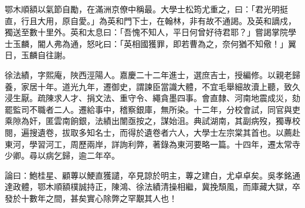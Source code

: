 \begin{pinyinscope}
鄂木順額以氣節自勵，在滿洲京僚中稱最。大學士松筠尤重之，曰：「君光明挺直，行且大用，原自愛。」為英和門下士，在翰林，非有故不通謁。及英和謫戍，獨送至數十里外。英和太息曰：「吾愧不知人，平日何曾好待君耶？」嘗謁掌院學士玉麟，閽人弗為通，怒叱曰：「英相國獲罪，即若曹為之，奈何猶不知儆！」翼日，玉麟自往謝。

徐法績，字熙庵，陜西涇陽人。嘉慶二十二年進士，選庶吉士，授編修。以親老歸養，家居十年。道光九年，遷御史，謂諫臣當識大體，不宜毛舉細故瀆上聽，致久浸生厭。疏陳求人才、捐文法、重守令、繩貪墨四事。會直隸、河南地震成災，劾罷監司不職者二人。遷給事中，稽察銀庫，無所染。十二年，分校會試，同官與吏乘隙為奸，匿雲南餉銀，法績出闈亟按之，謀始沮。典試湖南，其副病歿，獨專校閱，遍搜遺卷，拔取多知名士，而得於遺卷者六人，大學士左宗棠其首也。以薦赴東河，學習河工，周歷兩岸，詳詢利弊，著錄為東河要略一篇。十四年，遷太常寺少卿。尋以病乞歸，逾二年卒。

論曰：鮑桂星、顧蓴以鯁直獲譴，卒見諒於明主，蓴之建白，尤卓卓矣。吳孝銘通達政體，鄂木順額樸誠持正，陳鴻、徐法績清操相繼，冀挽頹風，而庫藏大獄，卒發於十數年之間，甚矣實心除弊之罕覯其人也！


\end{pinyinscope}